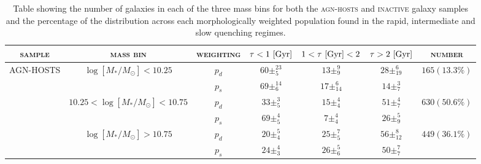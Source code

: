 \begin{table}
\centering
\caption{Table showing the number of galaxies in each of the three mass bins for both the \textsc{agn-hosts} and \textsc{inactive} galaxy samples and the percentage of the distribution across each morphologically weighted population found in the rapid, intermediate and slow quenching regimes.}
\label{massbins}
\begin{tabular}{c|c|c|c|c|c|c}
\hline
\textsc{sample}                     & \textsc{mass bin}                                        & \textsc{weighting}                  & $\tau < 1 ~\rm{[Gyr]}$                             & $1 < \tau ~\rm{[Gyr]} < 2 $          & $\tau > 2 ~\rm{[Gyr]}$                               & \textsc{number}                                        \\ \hline \hline
\multirow{6}{*}{AGN-HOSTS} & \multirow{2}{*}{$\log [M_*/M_{\odot}] < 10.25 $}                       & $p_d$     & $60\pm_{5}^{23}$                    & $13\pm_{9}^{9}$                    & $28\pm_{19}^{6}$       & \multirow{2}{*}{$165 (13.3\%)$}                      \\
                           &                                                 & $p_s$     & $69\pm_{6}^{14}$                    & $17\pm_{14}^{6}$                   & $14\pm_{7}^{3}$        &                                                      \\ \cline{2-7} 
                           & \multirow{2}{*}{$10.25 < \log [M_*/M_{\odot}] < 10.75$}                    & $p_d$     & $33\pm_{5}^{3}$                     & $15\pm_{4}^{4}$                    & $51\pm_{7}^{4}$        & \multirow{2}{*}{$630 (50.6\%)$}                      \\
                           &                                                 & $p_s$     & $69\pm_{5}^{4}$                     & $7\pm_{4}^{4}$                     & $26\pm_{9}^{5}$        &                                                      \\ \cline{2-7} 
                           & \multirow{2}{*}{$\log [M_*/M_{\odot}] > 10.75$}                      & $p_d$     & $20\pm_{4}^{5}$ & $25\pm_{5}^{7}$                    & $56\pm_{12}^{8}$       & \multirow{2}{*}{$449 (36.1\%)$}                      \\
                           &                                                 & $p_s$     & $24\pm_{3}^{4}$                     & $26\pm_{6}^{5}$                    & $50\pm_{7}^{7}$        &                                                      \\ \hline \hline

\end{tabular}
\end{table}
